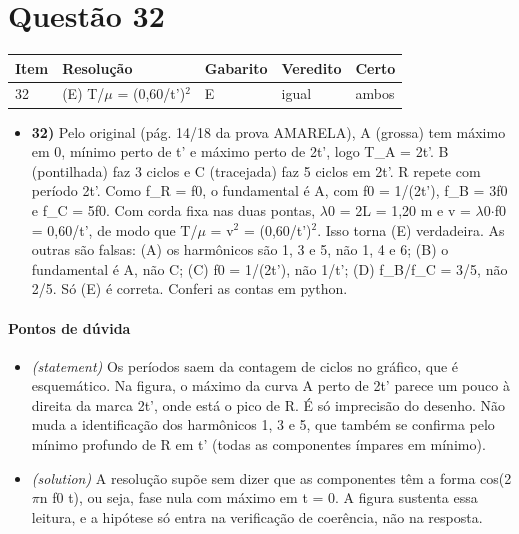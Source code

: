 \documentclass{article}%
\begin{document}
\section*{Questão 32}%
\begin{longtable}{@{}p{} p{} p{} p{} p{}@{}}\toprule Item & Resolução & Gabarito & Veredito & Certo \\ \midrule
32 & (E) T/$\mu$ = (0,60/t')$^2$ & E & igual & ambos \\
\bottomrule\end{longtable}%
\begin{itemize}%
\item%
\textbf{32)} Pelo original (pág. 14/18 da prova AMARELA), A (grossa) tem máximo em 0, mínimo perto de t' e máximo perto de 2t', logo T\_A = 2t'. B (pontilhada) faz 3 ciclos e C (tracejada) faz 5 ciclos em 2t'. R repete com período 2t'. Como f\_R = f0, o fundamental é A, com f0 = 1/(2t'), f\_B = 3f0 e f\_C = 5f0. Com corda fixa nas duas pontas, $\lambda$0 = 2L = 1,20 m e v = $\lambda$0$\cdot$f0 = 0,60/t', de modo que T/$\mu$ = v$^2$ = (0,60/t')$^2$. Isso torna (E) verdadeira. As outras são falsas: (A) os harmônicos são 1, 3 e 5, não 1, 4 e 6; (B) o fundamental é A, não C; (C) f0 = 1/(2t'), não 1/t'; (D) f\_B/f\_C = 3/5, não 2/5. Só (E) é correta. Conferi as contas em python.%
\end{itemize}%
\paragraph{Pontos de dúvida}%
\begin{itemize}%
\item%
\textit{(statement)} Os períodos saem da contagem de ciclos no gráfico, que é esquemático. Na figura, o máximo da curva A perto de 2t' parece um pouco à direita da marca 2t', onde está o pico de R. É só imprecisão do desenho. Não muda a identificação dos harmônicos 1, 3 e 5, que também se confirma pelo mínimo profundo de R em t' (todas as componentes ímpares em mínimo).%
\item%
\textit{(solution)} A resolução supõe sem dizer que as componentes têm a forma cos(2$\pi$n f0 t), ou seja, fase nula com máximo em t = 0. A figura sustenta essa leitura, e a hipótese só entra na verificação de coerência, não na resposta.%
\end{itemize}%
\end{document}
